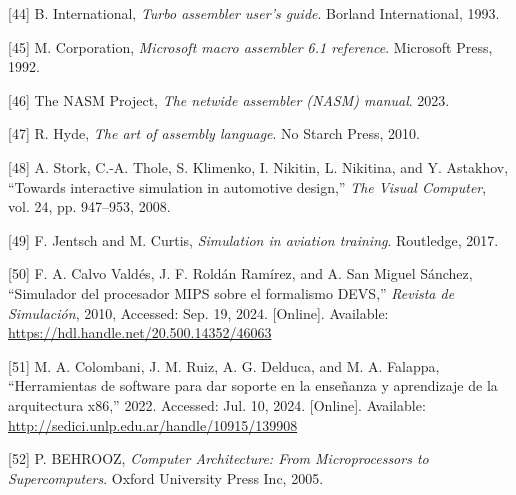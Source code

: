 \documentclass[12pt,oneside]{templates/unerthesis}
\newcommand{\CSLLeftMargin}[1]{#1} %
\newcommand{\CSLRightInline}[1]{#1} %
\newlength{\cslhangindent}
\newenvironment{CSLReferences}[2] %
 {\setlength{\parindent}{0pt}%
  \setlength{\leftskip}{#1 pt\relax}%
  \setlength{\parskip}{#2 pt\relax}%
  \everypar{\setlength{\hangindent}{\cslhangindent}}}
 {\par}
\begin{document}
\begin{CSLReferences}{0}{0}
\leavevmode{}%
\CSLLeftMargin{{[}44{]} }%
\CSLRightInline{B. International, \emph{Turbo assembler user's guide}. Borland International, 1993.}

\leavevmode{}%
\CSLLeftMargin{{[}45{]} }%
\CSLRightInline{M. Corporation, \emph{Microsoft macro assembler 6.1 reference}. Microsoft Press, 1992.}

\leavevmode{}%
\CSLLeftMargin{{[}46{]} }%
\CSLRightInline{The NASM Project, \emph{The netwide assembler (NASM) manual}. 2023.}

\leavevmode{}%
\CSLLeftMargin{{[}47{]} }%
\CSLRightInline{R. Hyde, \emph{The art of assembly language}. No Starch Press, 2010.}

\leavevmode{}%
\CSLLeftMargin{{[}48{]} }%
\CSLRightInline{A. Stork, C.-A. Thole, S. Klimenko, I. Nikitin, L. Nikitina, and Y. Astakhov, {``Towards interactive simulation in automotive design,''} \emph{The Visual Computer}, vol. 24, pp. 947--953, 2008.}

\leavevmode{}%
\CSLLeftMargin{{[}49{]} }%
\CSLRightInline{F. Jentsch and M. Curtis, \emph{Simulation in aviation training}. Routledge, 2017.}

\leavevmode{}%
\CSLLeftMargin{{[}50{]} }%
\CSLRightInline{F. A. Calvo Valdés, J. F. Roldán Ramírez, and A. San Miguel Sánchez, {``Simulador del procesador {MIPS} sobre el formalismo {DEVS},''} \emph{Revista de Simulación}, 2010, Accessed: Sep. 19, 2024. {[}Online{]}. Available: \url{https://hdl.handle.net/20.500.14352/46063}}

\leavevmode{}%
\CSLLeftMargin{{[}51{]} }%
\CSLRightInline{M. A. Colombani, J. M. Ruiz, A. G. Delduca, and M. A. Falappa, {``Herramientas de software para dar soporte en la enseñanza y aprendizaje de la arquitectura x86,''} 2022. Accessed: Jul. 10, 2024. {[}Online{]}. Available: \url{http://sedici.unlp.edu.ar/handle/10915/139908}}

\leavevmode{}%
\CSLLeftMargin{{[}52{]} }%
\CSLRightInline{P. BEHROOZ, \emph{Computer {Architecture}: {From} {Microprocessors} to {Supercomputers}}. Oxford University Press Inc, 2005.}

\end{CSLReferences}
\end{document}
